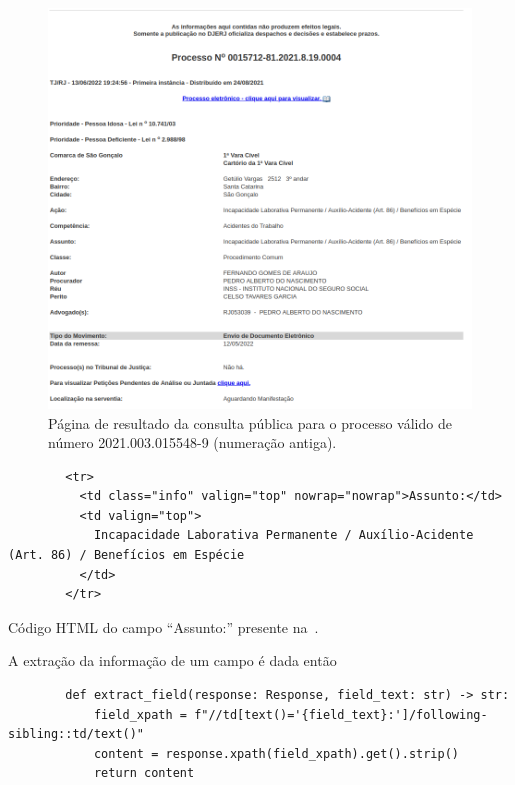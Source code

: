 \begin{figure}[H]
    \centering{}
    \includegraphics{img/exemplo-resultado-consulta-publica-1.png}
    \caption{%
        Página de resultado da consulta pública para o processo válido de
        número 2021.003.015548-9 (numeração
        antiga).\label{fig:exemplo-pagina-ww4}
    }
\end{figure}

\begin{listing}
    \centering{}
    \begin{verbatim}
        <tr>
          <td class="info" valign="top" nowrap="nowrap">Assunto:</td>
          <td valign="top">
            Incapacidade Laborativa Permanente / Auxílio-Acidente (Art. 86) / Benefícios em Espécie
          </td>
        </tr>
    \end{verbatim}
    \caption{Código HTML do campo ``Assunto:'' presente na~.\label{cod:html-assunto}}
\end{listing}

A extração da informação de um campo é dada então 

\begin{listing}[htb]
    \centering{}
    \begin{verbatim}
        def extract_field(response: Response, field_text: str) -> str:
            field_xpath = f"//td[text()='{field_text}:']/following-sibling::td/text()"
            content = response.xpath(field_xpath).get().strip()
            return content
    \end{verbatim}
    \caption{%
        Código da função responsável pela extração de um campo em uma resposta
        de uma requisição a uma página de visualização de processo.
    }
    \label{cod:extract_field}
\end{listing}

